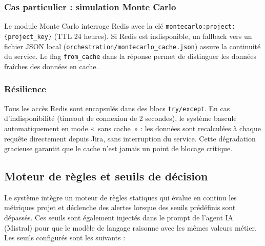 \subsubsection*{Cas particulier : simulation Monte Carlo}

Le module Monte Carlo interroge Redis avec la clé \texttt{montecarlo:project:\{project\_key\}} (TTL 24 heures). Si Redis est indisponible, un fallback vers un fichier JSON local (\texttt{orchestration/montecarlo\_cache.json}) assure la continuité du service. Le flag \texttt{from\_cache} dans la réponse permet de distinguer les données fraîches des données en cache.

\subsubsection*{Résilience}

Tous les accès Redis sont encapsulés dans des blocs \texttt{try/except}. En cas d’indisponibilité (timeout de connexion de 2 secondes), le système bascule automatiquement en mode « sans cache » : les données sont recalculées à chaque requête directement depuis Jira, sans interruption du service. Cette dégradation gracieuse garantit que le cache n’est jamais un point de blocage critique.

\subsection{Moteur de règles et seuils de décision}
Le système intègre un moteur de règles statiques qui évalue en continu les métriques projet et déclenche des alertes lorsque des seuils prédéfinis sont dépassés. Ces seuils sont également injectés dans le prompt de l’agent IA (Mistral) pour que le modèle de langage raisonne avec les mêmes valeurs métier. Les seuils configurés sont les suivants :

